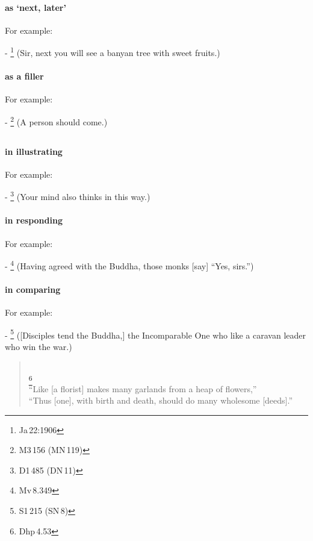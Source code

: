 \paragraph*{ as `next, later'} For example:\par
- \footnote{Ja\,22:1906} (Sir, next you will see a banyan tree with sweet fruits.) \par
\paragraph*{ as a filler} For example:\par
- \footnote{M3\,156 (MN\,119)} (A person should come.) \par

\subsection*{}\label{nip:evadm}
\paragraph*{ in illustrating} For example:\par
- \footnote{D1\,485 (DN\,11)} (Your mind also thinks in this way.) \par
\paragraph*{ in responding} For example:\par
- \footnote{Mv\,8.349} (Having agreed with the Buddha, those monks [say] ``Yes, sirs.'') \par
\paragraph*{ in comparing} For example:\par
- \footnote{S1\,215 (SN\,8)} ([Disciples tend the Buddha,] the Incomparable One who like a caravan leader who win the war.) \par
\begin{quote}
\\
\footnote{Dhp\,4.53}\\[1.5mm]
``Like [a florist] makes many garlands from a heap of flowers,''\\
``Thus [one], with birth and death, should do many wholesome [deeds].''
\end{quote}
